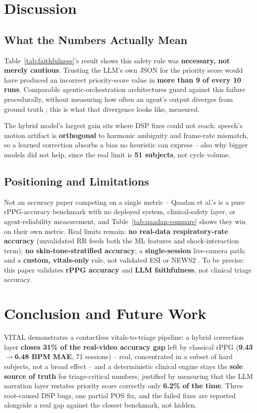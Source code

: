 \documentclass[conference]{IEEEtran}
\begin{document}
\section{\textbf{Discussion}}

\subsection{\textbf{What the Numbers Actually Mean}}
Table~\ref{tab:faithfulness}'s result shows this safety rule was \textbf{necessary, not merely cautious}. Trusting the LLM's own JSON for the priority score would have produced an incorrect priority-score value in \textbf{more than 9 of every 10 runs}. Comparable agentic-orchestration architectures guard against this failure procedurally, without measuring how often an agent's output diverges from ground truth \cite{b_warrier_agentic}; this is what that divergence looks like, measured.

The hybrid model's largest gain sits where DSP fixes could not reach: speech's motion artifact is \textbf{orthogonal} to harmonic ambiguity and frame-rate mismatch, so a learned correction absorbs a bias no heuristic can express -- also why bigger models did not help, since the real limit is \textbf{51 subjects}, not cycle volume.

\subsection{\textbf{Positioning and Limitations}}
Not an accuracy paper competing on a single metric -- Qaadan et al.'s is a pure rPPG-accuracy benchmark with no deployed system, clinical-safety layer, or agent-reliability measurement, and Table~\ref{tab:qaadan-compare} shows they win on their own metric. Real limits remain: \textbf{no real-data respiratory-rate accuracy} (unvalidated RR feeds both the ML features and shock-interaction term); \textbf{no skin-tone-stratified accuracy}; a \textbf{single-session} live-camera path; and a \textbf{custom, vitals-only} rule, not validated ESI or NEWS2 \cite{b_esi, b_news2}. To be precise: this paper validates \textbf{rPPG accuracy} and \textbf{LLM faithfulness}, not clinical triage accuracy.

\section{\textbf{Conclusion and Future Work}}

VITAL demonstrates a contactless vitals-to-triage pipeline: a hybrid correction layer \textbf{closes 31\% of the real-video accuracy gap} left by classical rPPG (\textbf{9.43$\to$6.48 BPM MAE}, 71 sessions) -- real, concentrated in a subset of hard subjects, not a broad effect -- and a deterministic clinical engine stays the \textbf{sole source of truth} for triage-critical numbers, justified by measuring that the LLM narration layer restates priority score correctly only \textbf{6.2\% of the time}. Three root-caused DSP bugs, one partial POS fix, and the failed fixes are reported alongside a real gap against the closest benchmark, not hidden.
\end{document}
